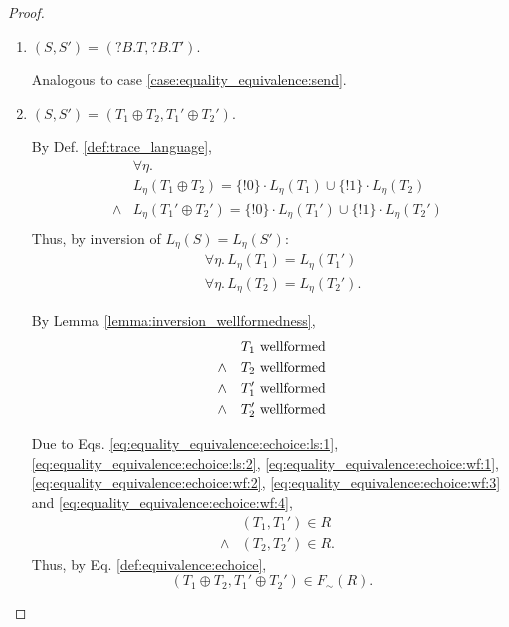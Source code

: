 \documentclass{llncs}
\newcommand*{\sequiv}{\sim}
\newcommand*{\union}{\cup}
\newcommand*{\send}{\mathord{!}}
\newcommand*{\recv}{\mathord{?}}
\newcommand*{\echoice}{\oplus}
\newcommand*{\concat}{\cdot}
\newcommand*{\wf}[1]{\text{$#1$ {\normalfont \rmfamily wellformed}}}
\renewcommand*{\|}{\;|\;}
\begin{document}
\begin{proof}
\begin{enumerate}
    \item
      \label{case:equality_equivalence:recv}
      $(S, S') = (\recv B.T, \recv B.T')$.

      Analogous to case \ref{case:equality_equivalence:send}.

    \item
      \label{case:equality_equivalence:echoice}
      $(S, S') = (T_1 \echoice T_2, T_1' \echoice T_2')$.

      By Def. \ref{def:trace_language},
      \begin{eqnarray*}
        &&      \forall \eta. \\
        &&      L_\eta(T_1 \echoice T_2)   = \{\send 0\} \concat L_\eta(T_1) \union \{\send 1\} \concat L_\eta(T_2) \\
        &\land& L_\eta(T_1' \echoice T_2') = \{\send 0\} \concat L_\eta(T_1') \union \{\send 1\} \concat L_\eta(T_2') \\
      \end{eqnarray*}
      Thus, by inversion of $L_\eta(S) = L_\eta(S')$:
      \begin{eqnarray}
        \label{eq:equality_equivalence:echoice:ls:1} && \forall \eta.\, L_\eta(T_1) = L_\eta(T_1') \\
        \label{eq:equality_equivalence:echoice:ls:2} && \forall \eta.\, L_\eta(T_2) = L_\eta(T_2').
      \end{eqnarray}

      By Lemma \ref{lemma:inversion_wellformedness},
      \begin{eqnarray}
        \label{eq:equality_equivalence:echoice:wf:1} &&      \wf{T_1} \\
        \label{eq:equality_equivalence:echoice:wf:2} &\land& \wf{T_2} \\
        \label{eq:equality_equivalence:echoice:wf:3} &\land& \wf{T_1'} \\
        \label{eq:equality_equivalence:echoice:wf:4} &\land& \wf{T_2'}
      \end{eqnarray}

      Due to Eqs.
      \ref{eq:equality_equivalence:echoice:ls:1},
      \ref{eq:equality_equivalence:echoice:ls:2},
      \ref{eq:equality_equivalence:echoice:wf:1},
      \ref{eq:equality_equivalence:echoice:wf:2},
      \ref{eq:equality_equivalence:echoice:wf:3} and
      \ref{eq:equality_equivalence:echoice:wf:4},
      \begin{eqnarray*}
        &&      (T_1, T_1') \in R \\
        &\land& (T_2, T_2') \in R.
      \end{eqnarray*}
      Thus, by Eq. \ref{def:equivalence:echoice},
      \begin{equation*}
        (T_1 \echoice T_2, T_1' \echoice T_2') \in F_\sequiv(R).
      \end{equation*}


\end{enumerate}
\end{proof}
\end{document}
